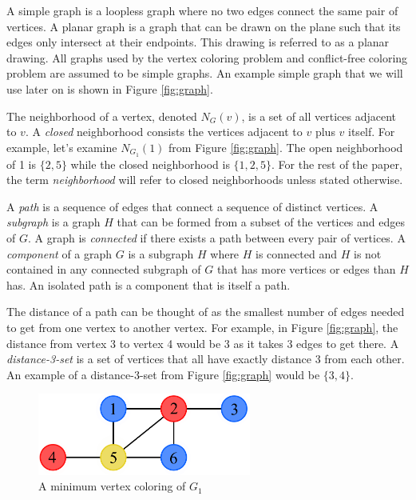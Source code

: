\documentclass{sig-alternate}
\begin{document}
A simple graph is a loopless graph where no two edges connect the same pair of vertices. A planar graph is a graph that can be drawn on the plane such that its edges only intersect at their endpoints. This drawing is referred to as a planar drawing. All graphs used by the vertex coloring problem and conflict-free coloring problem are assumed to be simple graphs. An example simple graph that we will use later on is shown in Figure \ref{fig:graph}.

The neighborhood of a vertex, denoted $N_G(v)$, is a set of all vertices adjacent to $v$. A \emph{closed} neighborhood consists the vertices adjacent to $v$ plus $v$ itself. For example, let's examine $N_{G_1}(1)$ from Figure \ref{fig:graph}. The open neighborhood of 1 is $\{2, 5\}$ while the closed neighborhood is $\{1, 2, 5\}$. For the rest of the paper, the term \emph{neighborhood} will refer to closed neighborhoods unless stated otherwise.

A \emph{path} is a sequence of edges that connect a sequence of distinct vertices. A \emph{subgraph} is a graph $H$ that can be formed from a subset of the vertices and edges of $G$. A graph is \emph{connected} if there exists a path between every pair of vertices. A \emph{component} of a graph $G$ is a subgraph $H$ where $H$ is connected and $H$ is not contained in any connected subgraph of $G$ that has more vertices or edges than $H$ has. An isolated path is a component that is itself a path.

The distance of a path can be thought of as the smallest number of edges needed to get from one vertex to another vertex. For example, in Figure \ref{fig:graph}, the distance from vertex 3 to vertex 4 would be 3 as it takes 3 edges to get there. A \emph{distance-3-set} is a set of vertices that all have exactly distance 3 from each other. An example of a distance-3-set from Figure \ref{fig:graph} would be $\{3,4\}$. \cite{bondy1976graph,west2001introduction}

\begin{figure}[h]
	\centering
	\includegraphics[width=7cm]{../figures/example-vcp.pdf}
	\caption{A minimum vertex coloring of $G_1$}\label{fig:vcp-example}
\end{figure}
\end{document}
